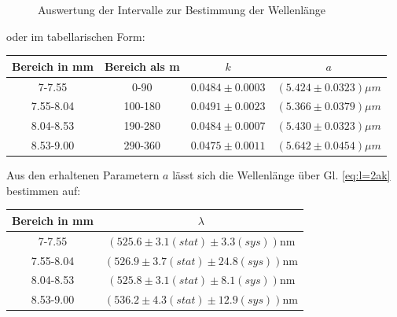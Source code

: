 \documentclass[12pt,a4paper]{article}
\begin{document}
\begin{figure}[H]
	\centering
	\qquad
	\caption{Auswertung der Intervalle zur Bestimmung der Wellenlänge}
	\label{fig:lambda_Intervall}
\end{figure}
oder im tabellarischen Form:
\begin{center}
	\begin{tabular}{|c|c|c|c|}
		\hline 
		Bereich in mm&Bereich als m & $k$  & $a$ \\
		\hline 
		\hline 
		7-7.55&0-90& $0.0484\pm0.0003$ &$(5.424\pm0.0323)\mu m$  \\ 
		\hline 
		7.55-8.04& 100-180 & $0.0491\pm0.0023$& $(5.366\pm0.0379)\mu m$ \\ 
		\hline 
		8.04-8.53&190-280& $0.0484\pm0.0007$ & $(5.430\pm0.0323)\mu m$ \\ 
		\hline 
		8.53-9.00& 290-360 & $0.0475\pm0.0011$ & $(5.642\pm0.0454)\mu m$ \\ 
		\hline 
	\end{tabular}  
\end{center}
Aus den erhaltenen Parametern $a$ lässt sich die Wellenlänge über Gl. \ref{eq:l=2ak} bestimmen auf:
\begin{center}
	\begin{tabular}{|c|c|}
		\hline 
		Bereich in mm&$\lambda$  \\ 
		\hline 
		7-7.55&$(525.6\pm3.1(stat) \pm3.3(sys))$nm \\ 
		\hline 
		7.55-8.04&$(526.9\pm3.7(stat)\pm24.8(sys))$nm\\ 
		\hline 
		8.04-8.53&$(525.8\pm3.1(stat)\pm8.1(sys)) $nm\\ 
		\hline 
		8.53-9.00&$(536.2\pm4.3(stat)\pm12.9(sys))$nm  \\ 
		\hline 
	\end{tabular}
\end{center}
\end{document}
